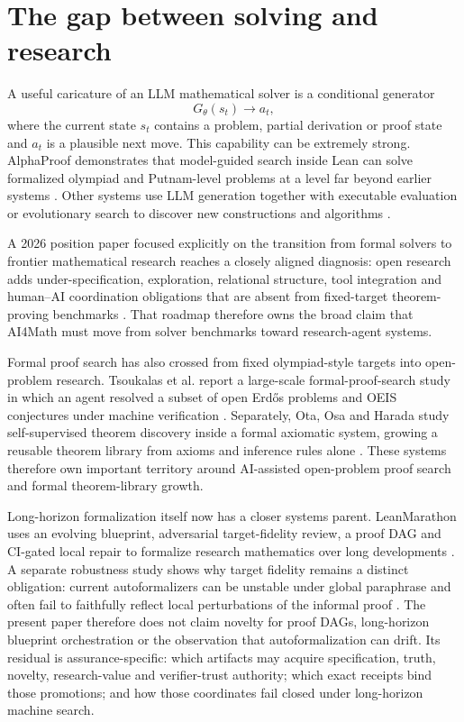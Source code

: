 \section{The gap between solving and research}

A useful caricature of an LLM mathematical solver is a conditional generator
\[
G_\theta(s_t)\rightarrow a_t,
\]
where the current state $s_t$ contains a problem, partial derivation or proof state and $a_t$ is a plausible next move. This capability can be extremely strong. AlphaProof demonstrates that model-guided search inside Lean can solve formalized olympiad and Putnam-level problems at a level far beyond earlier systems \cite{hubert2025}. Other systems use LLM generation together with executable evaluation or evolutionary search to discover new constructions and algorithms \cite{romera2024,novikov2025,georgiev2025}.

A 2026 position paper focused explicitly on the transition from formal solvers to frontier mathematical research reaches a closely aligned diagnosis: open research adds under-specification, exploration, relational structure, tool integration and human--AI coordination obligations that are absent from fixed-target theorem-proving benchmarks \cite{jiang2026frontier}. That roadmap therefore owns the broad claim that AI4Math must move from solver benchmarks toward research-agent systems.

Formal proof search has also crossed from fixed olympiad-style targets into open-problem research. Tsoukalas et al. report a large-scale formal-proof-search study in which an agent resolved a subset of open Erd\H{o}s problems and OEIS conjectures under machine verification \cite{tsoukalas2026open}. Separately, Ota, Osa and Harada study self-supervised theorem discovery inside a formal axiomatic system, growing a reusable theorem library from axioms and inference rules alone \cite{ota2026discovery}. These systems therefore own important territory around AI-assisted open-problem proof search and formal theorem-library growth.

Long-horizon formalization itself now has a closer systems parent. LeanMarathon uses an evolving blueprint, adversarial target-fidelity review, a proof DAG and CI-gated local repair to formalize research mathematics over long developments \cite{zhang2026leanmarathon}. A separate robustness study shows why target fidelity remains a distinct obligation: current autoformalizers can be unstable under global paraphrase and often fail to faithfully reflect local perturbations of the informal proof \cite{gui2026robust}. The present paper therefore does not claim novelty for proof DAGs, long-horizon blueprint orchestration or the observation that autoformalization can drift. Its residual is assurance-specific: which artifacts may acquire specification, truth, novelty, research-value and verifier-trust authority; which exact receipts bind those promotions; and how those coordinates fail closed under long-horizon machine search.


